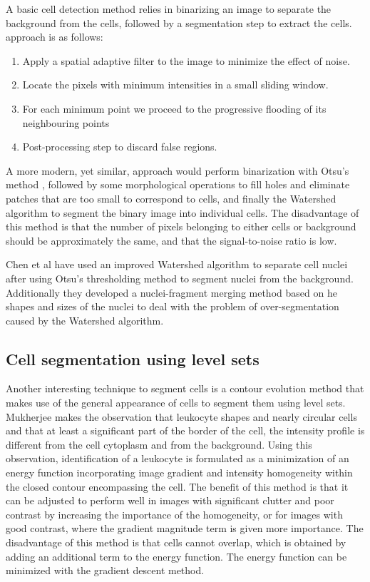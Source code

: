 \documentclass[12pt,a4paper,openany]{book}
\begin{document}
A basic cell detection method relies in binarizing an image to separate the background from the cells, followed by a segmentation step to extract the cells. \cite{chen99} approach is as follows:

\begin{enumerate}
  \item Apply a spatial adaptive filter to the image to minimize the effect of noise.
  \item Locate the pixels with minimum intensities in a small sliding window.
  \item For each minimum point we proceed to the progressive flooding of its neighbouring points
  \item Post-processing step to discard false regions.
\end{enumerate}

A more modern, yet similar, approach would perform binarization with Otsu's method \cite{otsu79}, followed by some morphological operations \cite{serra83} to fill holes and eliminate patches that are too small to correspond to cells, and finally the Watershed algorithm \cite{beucher79} to segment the binary image into individual cells. The disadvantage of this method is that the number of pixels belonging to either cells or background should be approximately the same, and that the signal-to-noise ratio is low.

Chen et al \cite{chen06} have used an improved Watershed algorithm \cite{vincent93} to separate cell nuclei after using Otsu's thresholding method to segment nuclei from the background. Additionally they developed a nuclei-fragment merging method based on he shapes and sizes of the nuclei to deal with the problem of over-segmentation caused by the Watershed algorithm.


\subsection{Cell segmentation using level sets}

Another interesting technique to segment cells is a contour evolution method that makes use of the general appearance of cells to segment them using level sets. Mukherjee \cite{mukherjee04} makes the observation that leukocyte shapes and nearly circular cells and that at least a significant part of the border of the cell, the intensity profile is different from the cell cytoplasm and from the background. Using this observation, identification of a leukocyte is formulated as a minimization of an energy function incorporating image gradient and intensity homogeneity within the closed contour encompassing the cell. The benefit of this method is that it can be adjusted to perform well in images with significant clutter and poor contrast by increasing the importance of the homogeneity, or for images with good contrast, where the gradient magnitude term is given more importance. The disadvantage of this method is that cells cannot overlap, which is obtained by adding an additional term to the energy function. The energy function can be minimized with the gradient descent method.
\end{document}
